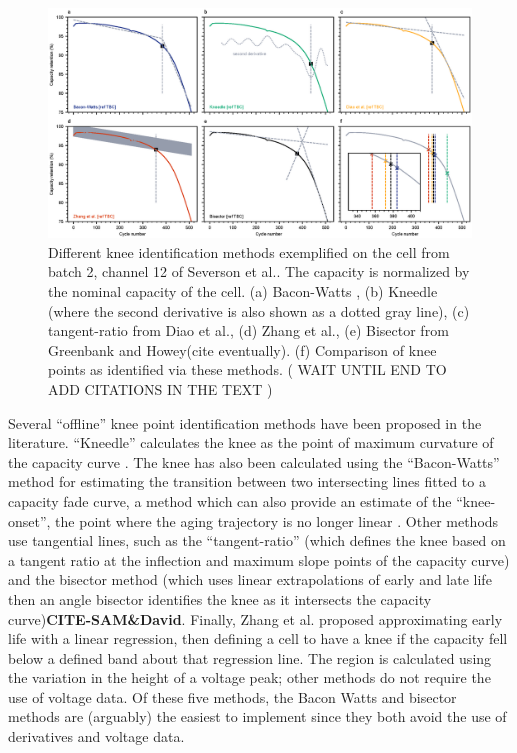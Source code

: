 \documentclass[journal=jpcl, manuscript=article, layout=onecolumn]{achemso}
\begin{document}
\begin{figure}[h!tb]
\centering
\includegraphics[scale=1]{figures/knee_identification_methods.eps}
\caption{Different knee identification methods exemplified on the cell from batch 2, channel 12 of Severson et al.\cite{severson_data-driven_2019}. The capacity is normalized by the nominal capacity of the cell. (a) Bacon-Watts \cite{fermin-cueto_identification_2020}, (b) Kneedle \cite{satopaa_finding_2011} (where the second derivative is also shown as a dotted gray line), (c) tangent-ratio from Diao et al.\cite{diao_algorithm_2019}, (d) Zhang et al.\cite{zhang_identifying_2020}, (e) Bisector from Greenbank and Howey(cite eventually). (f) Comparison of knee points as identified via these methods. 
(
WAIT UNTIL END TO ADD CITATIONS IN THE TEXT )}
\label{fig:knee_identification_methods}
\end{figure}

Several ``offline'' knee point identification methods have been proposed in the literature.
``Kneedle'' calculates the knee as the point of maximum curvature of the capacity curve \cite{satopaa_finding_2011}. The knee has also been calculated using the ``Bacon-Watts'' method for estimating the transition between two intersecting lines fitted to a capacity fade curve, a method which can also provide an estimate of the ``knee-onset'', the point where the aging trajectory is no longer linear \cite{fermin-cueto_identification_2020}. Other methods use tangential lines, such as the ``tangent-ratio'' (which defines the knee based on a tangent ratio at the inflection and maximum slope points of the capacity curve)\cite{diao_algorithm_2019} and the bisector method (which uses linear extrapolations of early and late life then an angle bisector identifies the knee as it intersects the capacity curve)\textbf{CITE-SAM\&David}. Finally, Zhang et al.\cite{zhang_accelerated_2019} proposed approximating early life with a linear regression, then defining a cell to have a knee if the capacity fell below a defined band about that regression line. The region is calculated using the variation in the height of a voltage peak; other methods do not require the use of voltage data. Of these five methods, the Bacon Watts and bisector methods are (arguably) the easiest to implement since they both avoid the use of derivatives and voltage data.
\end{document}
